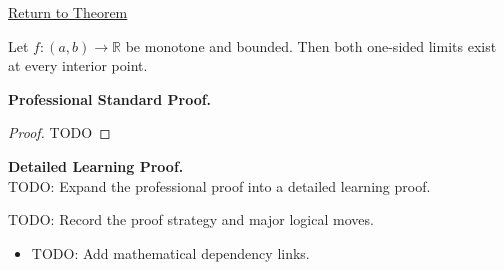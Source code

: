 \newpage
{}
\label{prf:monotone-limit-theorem}

\begin{remark*}[Return]
\hyperref[thm:monotone-limit-theorem]{Return to Theorem}
\end{remark*}

\begin{theorem*}
Let $f : (a,b) \to \mathbb{R}$ be monotone and bounded. Then both one-sided limits exist at every interior point.
\end{theorem*}

\textbf{Professional Standard Proof.}~\\
\begin{proof}
TODO
\end{proof}

\textbf{Detailed Learning Proof.}~\\
TODO: Expand the professional proof into a detailed learning proof.

\begin{remark*}
TODO: Record the proof strategy and major logical moves.
\end{remark*}

\begin{dependencies}
\begin{itemize}
  \item TODO: Add mathematical dependency links.
\end{itemize}
\end{dependencies}
